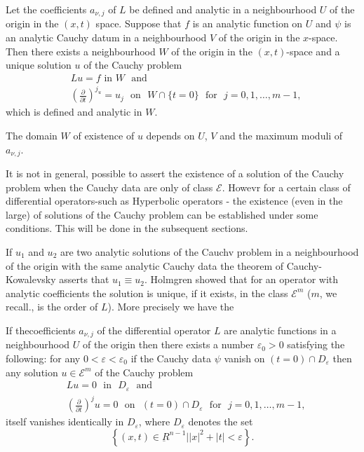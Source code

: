 \setcounter{theorem}{0}
\begin{theorem}\label{chap1-sec3-thm1} %
Let\pageoriginale 
the coefficients $a_{\nu,  j}$ of $L$ be defined and analytic in
 a neighbourhood $U$ of the origin in the $(x, t)$ space. Suppose that
 $f$ is an analytic function on $U$ and $\psi$  is an analytic Cauchy
 datum in a neighbourhood $V$ of the origin in the $x$-space. Then
 there exists a neighbourhood $W$ of the origin in the $(x,  t)$-space
 and a unique solution $u$ of the Cauchy problem 
\begin{equation*}
\begin{split}
& Lu = f \text{ in } W \text{~ and }\\
& \left(\frac{\partial}{\partial t}\right)^{j_{u}} =u_j \text{~ on~ } W \cap
  \{ t = 0 \}   \text{~ for~ } j=0, 1, \ldots ,  m-1, 
\end{split}\tag{3.2}\label{chap1-eq3.2}
\end{equation*}
which is defined and analytic in $W$.
\end{theorem}

\begin{remark*}
The domain $W$ of existence of $u$ depends on $U$, $V$ and the
maximum moduli of $a_{\nu,j}$. 
\end{remark*}

It is not in general,  possible to assert the existence of a solution
of the Cauchy problem when the Cauchy data are only of class
$\mathscr{E}$. Howevr for a certain class of differential
operators-such as Hyperbolic operators - the existence (even in the
large) of solutions of the Cauchy problem can be established under some
conditions. This will be done in the subsequent sections. 

If $u_1$ and  $u_2$ are two  analytic solutions of the Cauchv problem
in a neighbourhood of the origin with the same analytic Cauchy data
the theorem of Cauchy-Kowalevsky asserts that $u_1\equiv
u_2$. Holmgren showed that for an operator with analytic coefficients
the solution is unique,  if it exists, in the class $\mathscr{E}^m$
($m$,  we recall., is the order of $L$). More precisely we have the 

\begin{theorem}[Holmgren]\label{chap1-sec3-thm2} %
 If the\pageoriginale coefficients $a_{\nu, j}$ of the
 differential operator $L$ are analytic functions in a neighbourhood
 $U$ of the origin then there exists a number $\varepsilon_0 > 0$
 satisfying the following: for any $0 <\varepsilon < \varepsilon_0$ if
 the Cauchy data $\psi$ vanish on $(t=0) \cap D_\varepsilon$ then any
 solution $u \in \mathscr{E}^m$ of the Cauchy problem 
\begin{align*}
& Lu = 0 \text{~ in~ } D_\varepsilon \text{~ and}\\ 
& \left(\frac{\partial}{\partial t}\right)^j u=0 \text{~ on~ } (t=0) \cap
D_\varepsilon \text{~ for~ } j = 0,  1,  \ldots,  m-1,  
\end{align*}
itself vanishes identically in $D_\varepsilon$,  where
$D_{\varepsilon}$ denotes the set 
$$
\left\{(x,  t)\in \underbar{R}^{n-1} \bigg| | x |^2 + | t | <
\varepsilon \right\}. 
$$
\end{theorem}


